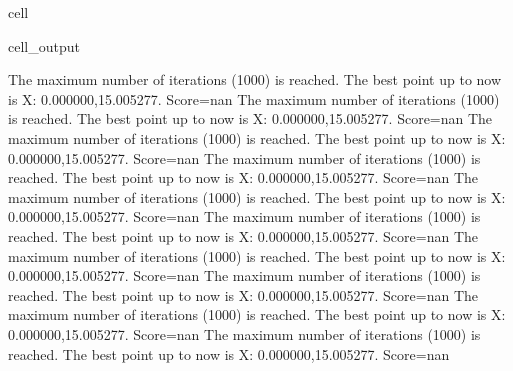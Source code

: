 \documentclass[letterpaper,10pt,english]{jupyterBook}
\begin{document}
\begin{sphinxuseclass}{cell}
\begin{sphinxVerbatimOutput}
\begin{sphinxuseclass}{cell_output}
\begin{sphinxVerbatim}[commandchars=\\\{\}]
The maximum number of iterations (1000) is reached. The best point up to now is X: \PYGZob{}0.000000,15.005277\PYGZcb{}. Score=\PYGZhy{}nan
The maximum number of iterations (1000) is reached. The best point up to now is X: \PYGZob{}0.000000,15.005277\PYGZcb{}. Score=\PYGZhy{}nan
The maximum number of iterations (1000) is reached. The best point up to now is X: \PYGZob{}0.000000,15.005277\PYGZcb{}. Score=\PYGZhy{}nan
The maximum number of iterations (1000) is reached. The best point up to now is X: \PYGZob{}0.000000,15.005277\PYGZcb{}. Score=\PYGZhy{}nan
The maximum number of iterations (1000) is reached. The best point up to now is X: \PYGZob{}0.000000,15.005277\PYGZcb{}. Score=\PYGZhy{}nan
The maximum number of iterations (1000) is reached. The best point up to now is X: \PYGZob{}0.000000,15.005277\PYGZcb{}. Score=\PYGZhy{}nan
The maximum number of iterations (1000) is reached. The best point up to now is X: \PYGZob{}0.000000,15.005277\PYGZcb{}. Score=\PYGZhy{}nan
The maximum number of iterations (1000) is reached. The best point up to now is X: \PYGZob{}0.000000,15.005277\PYGZcb{}. Score=\PYGZhy{}nan
The maximum number of iterations (1000) is reached. The best point up to now is X: \PYGZob{}0.000000,15.005277\PYGZcb{}. Score=\PYGZhy{}nan
The maximum number of iterations (1000) is reached. The best point up to now is X: \PYGZob{}0.000000,15.005277\PYGZcb{}. Score=\PYGZhy{}nan
\end{sphinxVerbatim}


\end{sphinxuseclass}
\end{sphinxVerbatimOutput}
\end{sphinxuseclass}
\end{document}
